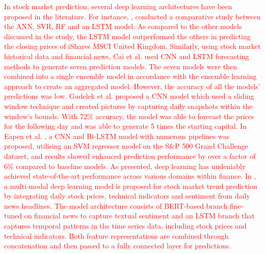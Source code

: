 \documentclass[preprint,12pt]{elsarticle}
\begin{document}
\textcolor{red}{In stock market prediction, several deep learning architectures have been proposed in the literature. For instance, \citep{nikou2019stock}, conducted a comparative study between the ANN, SVR, RF and an LSTM model. As compared to the other models discussed in the study, the LSTM model outperformed the others in predicting the closing prices of iShares MSCI United Kingdom. Similarly, using stock market historical data and financial news, Cai et al. \citep{cai2018financial} used CNN and LSTM forecasting methods to generate seven prediction models. The seven models were then combined into a single ensemble model in accordance with the ensemble learning approach to create an aggregated model. However, the accuracy of all the models' predictions was low. Gudelek et al. \citep{gudelek2017deep} proposed a CNN model which used a sliding window technique and created pictures by capturing daily snapshots within the window's bounds. With 72\% accuracy, the model was able to forecast the prices for the following day and was able to generate 5 times the starting capital. In Eapen et al. \citep{eapen2019novel}, a CNN and Bi-LSTM model with numerous pipelines was proposed, utilising an SVM regressor model on the S\&P 500 Grand Challenge dataset, and results showed enhanced prediction performance by over a factor of 6\% compared to baseline models. As presented, deep learning has undeniably achieved state-of-the-art performance across various domains within finance. In \citep{chen_deep_2024}, a multi-modal deep learning model is proposed for stock market trend prediction by integrating daily stock prices, technical indicators and sentiment from daily news headlines. The model architecture consists of BERT-based branch fine-tuned on financial news to capture textual sentiment and an LSTM branch that captures temporal patterns in the time series data, including stock prices and technical indicators. Both feature representations are combined through concatenation and then passed to a fully connected layer for predictions.}
\end{document}
